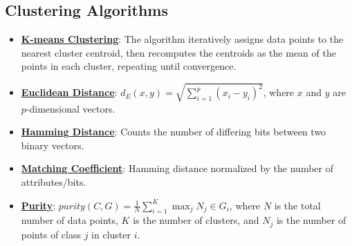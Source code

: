 \documentclass{article}%
\begin{document}
%
\subsection{Clustering Algorithms}%
\label{subsec:ClusteringAlgorithms}%
\begin{itemize}[leftmargin=*]%
\item \href{https://www.math.purdue.edu/~yipn/351/12L2-distance-clusters.pdf#page=22}{\textbf{K-means Clustering}}: The algorithm iteratively assigns data points to the nearest cluster centroid, then recomputes the centroids as the mean of the points in each cluster, repeating until convergence.%
\item \href{https://www.math.purdue.edu/~yipn/351/12L2-distance-clusters.pdf#page=17}{\textbf{Euclidean Distance}}: $d_E(x, y) = \sqrt{\sum_{i=1}^{p} (x_i - y_i)^2}$, where $x$ and $y$ are $p$-dimensional vectors.%
\item \href{https://www.math.purdue.edu/~yipn/351/12L2-distance-clusters.pdf#page=19}{\textbf{Hamming Distance}}: Counts the number of differing bits between two binary vectors.%
\item \href{https://www.math.purdue.edu/~yipn/351/12L2-distance-clusters.pdf#page=19}{\textbf{Matching Coefficient}}: Hamming distance normalized by the number of attributes/bits.%
\item \href{https://www.math.purdue.edu/~yipn/351/12L2-distance-clusters.pdf#page=44}{\textbf{Purity}}: $purity(C, G) = \frac{1}{N} \sum_{i=1}^{K} \max_{j} N_j \in G_i$, where $N$ is the total number of data points, $K$ is the number of clusters, and $N_j$ is the number of points of class $j$ in cluster $i$.%
\end{itemize}

%
\end{document}
